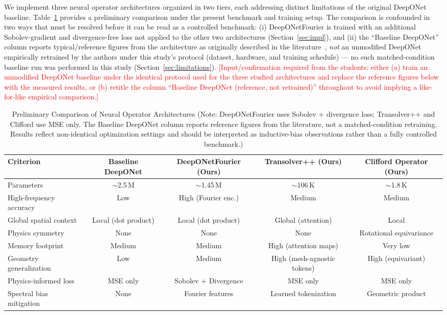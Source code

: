 \documentclass[journal]{IEEEtran}
\begin{document}
We implement three neural operator architectures organized in two tiers, each addressing distinct limitations of the original DeepONet baseline.
Table~\ref{tab:comparison} provides a preliminary comparison under the present benchmark and training setup. The comparison is confounded in two ways that must be resolved before it can be read as a controlled benchmark: (i) DeepONetFourier is trained with an additional Sobolev-gradient and divergence-free loss not applied to the other two architectures (Section~\ref{sec:impl}), and (ii) the ``Baseline DeepONet'' column reports typical/reference figures from the architecture as originally described in the literature~\cite{lu2021deeponet}, \emph{not} an unmodified DeepONet empirically retrained by the authors under this study's protocol (dataset, hardware, and training schedule) --- no such matched-condition baseline run was performed in this study (Section~\ref{sec:limitations}). \textcolor{red}{[Input/confirmation required from the students: either (a) train an unmodified DeepONet baseline under the identical protocol used for the three studied architectures and replace the reference figures below with the measured results, or (b) retitle the column ``Baseline DeepONet (reference, not retrained)'' throughout to avoid implying a like-for-like empirical comparison.]}

\begin{table}[htbp]
\caption{Preliminary Comparison of Neural Operator Architectures (Note: DeepONetFourier uses Sobolev + divergence loss; Transolver++ and Clifford use MSE only. The Baseline DeepONet column reports reference figures from the literature, not a matched-condition retraining. Results reflect non-identical optimization settings and should be interpreted as inductive-bias observations rather than a fully controlled benchmark.)}
\label{tab:comparison}
\centering
\begin{tabular}{lcccc}
\toprule
\textbf{Criterion} & \textbf{Baseline DeepONet} & \textbf{DeepONetFourier (Ours)} & \textbf{Transolver++ (Ours)} & \textbf{Clifford Operator (Ours)} \\
\midrule
Parameters & $\sim$2.5\,M & $\sim$1.45\,M & $\sim$106\,K & $\sim$1.8\,K \\
High-frequency accuracy & Low & High (Fourier enc.) & Medium & Medium \\
Global spatial context & Local (dot product) & Local (dot product) & Global (attention) & Local \\
Physics symmetry & None & None & None & Rotational equivariance \\
Memory footprint & Medium & Medium & High (attention maps) & Very low \\
Geometry generalization & Low & Medium & High (mesh-agnostic tokens) & High (equivariant) \\
Physics-informed loss & MSE only & Sobolev + Divergence & MSE only & MSE only \\
Spectral bias mitigation & None & Fourier features & Learned tokenization & Geometric product \\
\bottomrule
\end{tabular}
\end{table}
\end{document}
